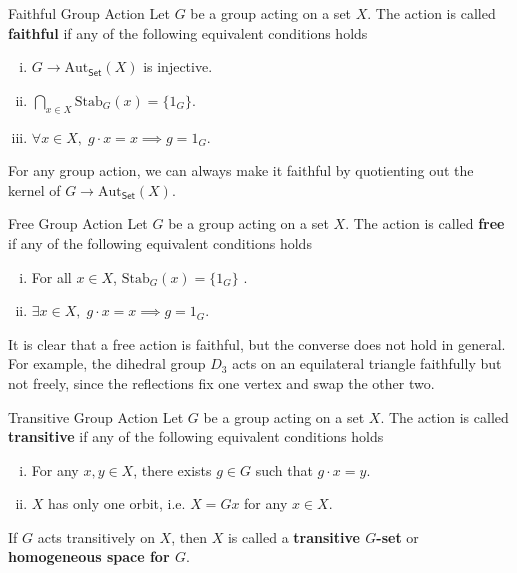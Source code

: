 \begin{definition}{Faithful Group Action}{}
    Let $G$ be a group acting on a set $X$. The action is called \textbf{faithful} if any of the following equivalent conditions holds
    \begin{enumerate}[(i)]
        \item $G\to \mathrm{Aut}_{\mathsf{Set}}(X)$ is injective.
        \item $\bigcap\limits_{x\in X}\mathrm{Stab}_G(x)=\{ 1_G\}$.
        \item $\forall x\in X,\;g\cdot x=x\implies g=1_G$.
    \end{enumerate}
\end{definition}

For any group action, we can always make it faithful by quotienting out the kernel of $G\to \mathrm{Aut}_{\mathsf{Set}}(X)$.


\begin{definition}{Free Group Action}{}
    Let $G$ be a group acting on a set $X$. The action is called \textbf{free} if any of the following equivalent conditions holds
    \begin{enumerate}[(i)]
        \item For all $x\in X$, $\mathrm{Stab}_G(x)=\{ 1_G\}$ .
        \item $\exists x\in X,\;g\cdot x=x\implies g=1_G$.
    \end{enumerate}
\end{definition}

It is clear that a free action is faithful, but the converse does not hold in general. For example, the dihedral group $D_3$ acts on an equilateral triangle faithfully but not freely, since the reflections fix one vertex and swap the other two.

\begin{definition}{Transitive Group Action}{}
    Let $G$ be a group acting on a set $X$. The action is called \textbf{transitive} if any of the following equivalent conditions holds
    \begin{enumerate}[(i)]
        \item For any $x,y\in X$, there exists $g\in G$ such that $g\cdot x=y$.
        \item $X$ has only one orbit, i.e. $X= Gx$ for any $x\in X$.
    \end{enumerate}
    If $G$ acts transitively on $X$, then $X$ is called a \textbf{transitive $G$-set} or \textbf{homogeneous space for $G$}.
\end{definition}

